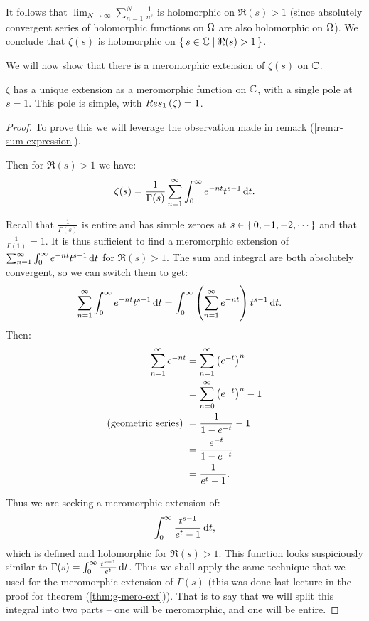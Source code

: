 It follows that $\lim_{N \to \infty} \sum_{n=1}^N \frac{1}{n^s}$ is holomorphic on $\Re(s) > 1$ (since absolutely convergent series of holomorphic functions on $\Omega$ are also holomorphic on $\Omega$). We conclude that $\zeta(s)$ is holomorphic on $\set{s \in \mathbb{C}\mid \Re(s) >1 }$.

We will now show that there is a meromorphic extension of $\zeta(s)$ on $\mathbb{C}$.

\begin{theorem}[Riemann]\label{thm:r-zeta-extension-thm}
$\zeta$ has a unique extension as a meromorphic function on $\mathbb{C}$, with a single pole at $s=1$. This pole is simple, with $Res_{1} \left( \zeta \right) = 1$.
\end{theorem}

\begin{proof}
To prove this we will leverage the observation made in remark (\ref{rem:r-sum-expression}).

Then for $\Re(s) > 1$ we have:
\begin{align*}
    \zeta(s) = \frac{1}{\Gamma(s) } \sum_{n=1}^\infty \int_0^\infty e^{-nt} t^{s-1} \dif t.
\end{align*}

Recall that $\frac{1}{\Gamma(s) }$ is entire and has simple zeroes at $s \in \set{0,-1,-2, \cdots}$ and that $\frac{1}{\Gamma(1)} = 1$. It is thus sufficient to find a meromorphic extension of $\sum_{n=1}^\infty \int_0^\infty e^{-nt} t^{s-1} \dif t$ for $\Re(s) > 1$. The sum and integral are both absolutely convergent, so we can switch them to get:
\begin{align*}
    \sum_{n=1}^\infty \int_0^\infty e^{-nt} t^{s-1} \dif t &= \int_0^\infty \br{\sum_{n=1}^\infty  e^{-nt} } t^{s-1} \dif t.
\end{align*}
Then:
\begin{align*}
    \sum_{n=1}^\infty  e^{-nt} &= \sum_{n=1}^\infty  \left( e^{-t} \right)^n\\
    &=\sum_{n=0}^\infty  \left( e^{-t} \right)^n - 1\\
    \text{(geometric series) }&= \frac{1}{1-e^{-t}} - 1\\
    &= \frac{e^{-t}}{1-e^{-t}}\\
    &= \frac{1}{e^t - 1}.
\end{align*}


Thus we are seeking a meromorphic extension of:
\begin{align*}
    \int_0^\infty \frac{t^{s-1}}{e^t - 1}  \dif t,
\end{align*}
which is defined and holomorphic for $\Re(s) > 1$. This function looks suspiciously similar to $\Gamma(s) = \int_0^\infty \frac{t^{s-1}}{e^t }  \dif t$. Thus we shall apply the same technique that we used for the meromorphic extension of $\Gamma(s)$ (this was done last lecture in the proof for theorem (\ref{thm:g-mero-ext})). That is to say that we will split this integral into two parts -- one will be meromorphic, and one will be entire.


\end{proof}
